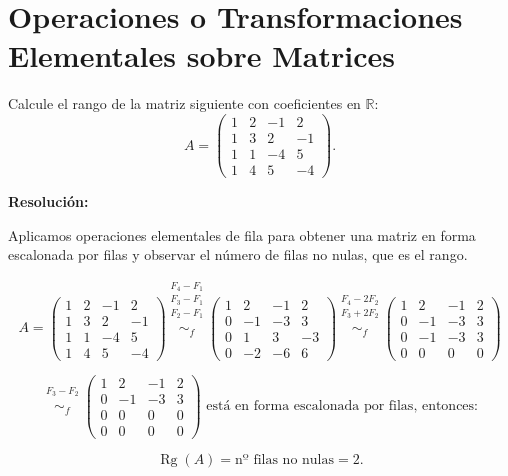 \documentclass[a4paper,12pt]{article}
\begin{document}
\section{Operaciones o Transformaciones Elementales sobre Matrices}

\begin{ejercicio}[title=Ejercicio 8]
Calcule el rango de la matriz siguiente con coeficientes en $\mathbb{R}$:
\[
A =
\begin{pmatrix}
1 & 2 & -1 & 2\\
1 & 3 & 2 & -1\\
1 & 1 & -4 & 5\\
1 & 4 & 5 & -4
\end{pmatrix}.
\]

\tcblower
\textbf{Resolución:}

Aplicamos operaciones elementales de fila para obtener una matriz en forma escalonada por filas y observar el número de filas no nulas, que es el rango.

\[
A =
\begin{pmatrix}
1 & 2 & -1 & 2\\
1 & 3 & 2 & -1\\
1 & 1 & -4 & 5\\
1 & 4 & 5 & -4
\end{pmatrix}
\overset{\substack{F_4 - F_1 \\ F_3 - F_1 \\ F_2 - F_1 \\{}}}{\sim_f}
\begin{pmatrix}
1 & 2 & -1 & 2\\
0 & -1 & -3 & 3\\
0 & 1 & 3 & -3\\
0 & -2 & -6 & 6
\end{pmatrix}
\overset{\substack{F_4 - 2F_2 \\ F_3 + 2F_2 \\{}}}{\sim_f}
\begin{pmatrix}
1 & 2 & -1 & 2\\
0 & -1 & -3 & 3\\
0 & -1 & -3 & 3\\
0 & 0 & 0 & 0
\end{pmatrix}
\]

\[
\overset{\substack{F_3 - F_2 \\{}}}{\sim_f}
\begin{pmatrix}
1 & 2 & -1 & 2\\
0 & -1 & -3 & 3\\
0 & 0 & 0 & 0\\
0 & 0 & 0 & 0
\end{pmatrix}
\text{ está en forma escalonada por filas, entonces:}
\]

\[
\operatorname{Rg}(A) = \text{nº filas no nulas} = \boxed{2}.
\]
\end{ejercicio}
\end{document}
